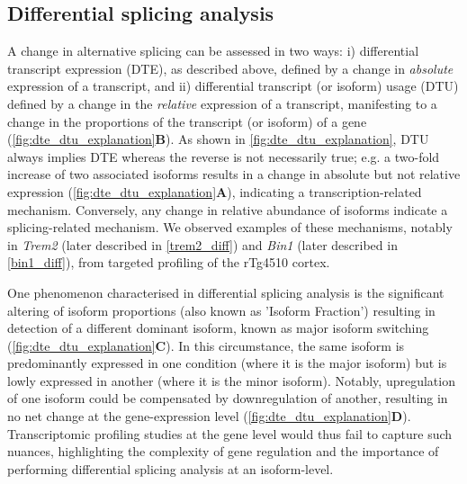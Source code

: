 \subsection{Differential splicing analysis}\label{intro:dtu}
A change in alternative splicing can be assessed in two ways: i) differential transcript expression (DTE), as described above, defined by a change in \textit{absolute} expression of a transcript, and ii) differential transcript (or isoform) usage (DTU) defined by a change in the \textit{relative} expression of a transcript, manifesting to a change in the proportions of the transcript (or isoform) of a gene (\cref{fig:dte_dtu_explanation}\textbf{B}). As shown in \cref{fig:dte_dtu_explanation}, DTU always implies DTE whereas the reverse is not necessarily true; e.g. a two-fold increase of two associated isoforms results in a change in absolute but not relative expression (\cref{fig:dte_dtu_explanation}\textbf{A}), indicating a transcription-related mechanism. Conversely, any change in relative abundance of isoforms indicate a splicing-related mechanism. We observed examples of these mechanisms, notably in \textit{Trem2} (later described in \cref{trem2_diff}) and \textit{Bin1} (later described in \cref{bin1_diff}), from targeted profiling of the rTg4510 cortex.

One phenomenon characterised in differential splicing analysis is the significant altering of isoform proportions (also known as 'Isoform Fraction') resulting in detection of a different dominant isoform, known as major isoform switching (\cref{fig:dte_dtu_explanation}\textbf{C}). In this circumstance, the same isoform is predominantly expressed in one condition (where it is the major isoform) but is lowly expressed in another (where it is the minor isoform). Notably, upregulation of one isoform could be compensated by downregulation of another, resulting in no net change at the gene-expression level (\cref{fig:dte_dtu_explanation}\textbf{D}). Transcriptomic profiling studies at the gene level would thus fail to capture such nuances, highlighting the complexity of gene regulation and the importance of performing differential splicing analysis at an isoform-level. 


